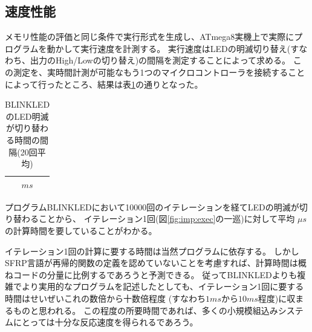 \subsection{速度性能}\label{sec:implementation:performance:speed}
メモリ性能の評価と同じ条件で実行形式を生成し、ATmega8実機上で実際にプログラムを動かして実行速度を計測する。
実行速度はLEDの明滅切り替え(すなわち、出力のHigh/Lowの切り替え)の間隔を測定することによって求める。
この測定を、実時間計測が可能なもう1つのマイクロコントローラを接続することによって行ったところ、結果は表\ref{fig:imp:time1}の通りとなった。

\begin{table}[h]
  \centering
  \begin{tabular}{c}
    $ ms$ \\ \hline
  \end{tabular}
\caption{BLINKLEDのLED明滅が切り替わる時間の間隔(20回平均)}
\label{fig:imp:time1}
\end{table}

プログラムBLINKLEDにおいて10000回のイテレーションを経てLEDの明滅が切り替わることから、
イテレーション1回(図\ref{fig:imp:exec}の一巡)に対して平均
$  \mu s$
の計算時間を要していることがわかる。

イテレーション1回の計算に要する時間は当然プログラムに依存する。
しかしSFRP言語が再帰的関数の定義を認めていないことを考慮すれば、計算時間は概ねコードの分量に比例するであろうと予測できる。
従ってBLINKLEDよりも複雑でより実用的なプログラムを記述したとしても、イテレーション1回に要する時間はせいぜいこれの数倍から十数倍程度
(すなわち$1ms$から$10ms$程度)に収まるものと思われる。
この程度の所要時間であれば、多くの小規模組込みシステムにとっては十分な反応速度を得られるであろう。
